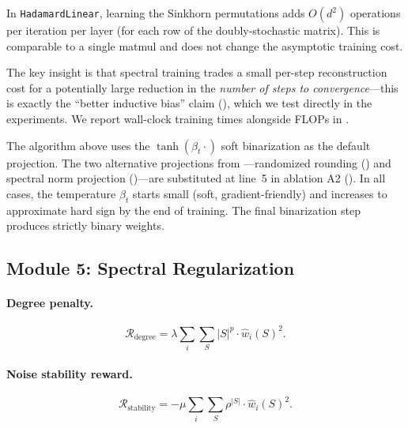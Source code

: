 \documentclass[12pt,a4paper]{article}
\theoremstyle{plain}
\theoremstyle{definition}
\theoremstyle{remark}
\newcommand{\what}{\widehat{w}}
\begin{document}
In \texttt{HadamardLinear}, learning the Sinkhorn permutations adds $O(d^2)$ operations per iteration per layer (for each row of the doubly-stochastic matrix). This is comparable to a single matmul and does not change the asymptotic training cost.

The key insight is that spectral training trades a small per-step reconstruction cost for a potentially large reduction in the \emph{number of steps to convergence}---this is exactly the ``better inductive bias'' claim (), which we test directly in the experiments. We report wall-clock training times alongside FLOPs in .

The algorithm above uses the $\tanh(\beta_t \cdot)$ soft binarization as the default projection. The two alternative projections from ---randomized rounding () and spectral norm projection ()---are substituted at line~5 in ablation A2 (). In all cases, the temperature $\beta_t$ starts small (soft, gradient-friendly) and increases to approximate hard sign by the end of training. The final binarization step produces strictly binary weights.


\subsection{Module 5: Spectral Regularization}\label{sec:regularization}

\paragraph{Degree penalty.}
\begin{equation}\label{eq:degree-penalty}
    \mathcal{R}_{\text{degree}} = \lambda \sum_i \sum_{S} |S|^p \cdot \what_i(S)^2.
\end{equation}

\paragraph{Noise stability reward.}
\begin{equation}\label{eq:stability-reward}
    \mathcal{R}_{\text{stability}} = -\mu \sum_i \sum_{S} \rho^{|S|} \cdot \what_i(S)^2.
\end{equation}
\end{document}
